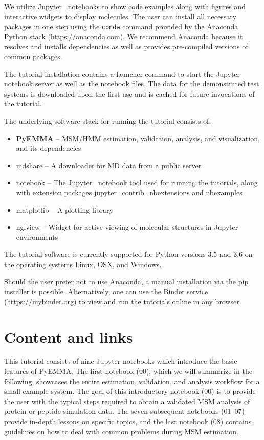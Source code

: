 \documentclass[9pt,tutorial]{livecoms}
\begin{document}
We utilize Jupyter~\cite{jupyter} notebooks to show code examples along with figures and interactive widgets to display molecules.
The user can install all necessary packages in one step using the \texttt{conda} command provided by the Anaconda Python stack (\url{https://anaconda.com}).
We recommend Anaconda because it resolves and installs dependencies as well as provides pre-compiled versions of common packages.

The tutorial installation contains a launcher command to start the Jupyter notebook server as well as the notebook files.
The data for the demonstrated test systems is downloaded upon the first use and is cached for future invocations of the tutorial.

The underlying software stack for running the tutorial consists of:
\begin{itemize}
\item \textbf{PyEMMA} -- MSM/HMM estimation, validation, analysis, and visualization, and its dependencies~\cite{pyemma}
\item mdshare -- A downloader for MD data from a public server
\item notebook -- The Jupyter~\cite{jupyter} notebook tool used for running the tutorials, along with extension packages jupyter\_contrib\_nbextensions and nbexamples
\item matplotlib -- A plotting library~\cite{matplotlib}
\item nglview -- Widget for active viewing of molecular structures in Jupyter environments~\cite{nglview}
\end{itemize}

The tutorial software is currently supported for Python versions $3.5$ and $3.6$ on the operating systems Linux, OSX, and Windows.

Should the user prefer not to use Anaconda, a manual installation via the pip installer is possible.
Alternatively, one can use the Binder service (\url{https://mybinder.org}) to view and run the tutorials online in any browser.

\section{Content and links}

This tutorial consists of nine Jupyter notebooks which introduce the basic features of PyEMMA.
The first notebook (00), which we will summarize in the following, showcases the entire estimation, validation, and analysis workflow for a small example system.
The goal of this introductory notebook (00) is to provide the user with the typical steps required to obtain a validated MSM analysis of protein or peptide simulation data.
The seven subsequent notebooks (01--07) provide in-depth lessons on specific topics, and the last notebook (08) contains guidelines on how to deal with common problems during MSM estimation.
\end{document}
